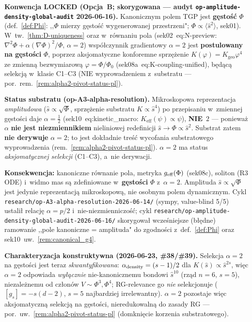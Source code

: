 \begin{remark}%
\label{rem:amplitude-vs-density-alpha}
\textbf{Konwencja LOCKED (Opcja~B; skorygowana --- audyt \texttt{op-amplitude-density-global-audit} 2026-06-16).}
Kanonicznym polem TGP jest \textbf{g\k{e}sto\'s\'c} $\Phi$ (def.~\ref{def:Phi}: ,,$\Phi$ mierzy g\k{e}sto\'s\'c
wygenerowanej przestrzeni"; $\Phi\propto\langle\hat s^2\rangle$, sek01). W~tw.~\ref{thm:D-uniqueness}
oraz w~r\'ownaniu pola (sek02~eq:N-preview: $\nabla^2\Phi+\alpha(\nabla\Phi)^2/\Phi$, $\alpha=2$)
wsp\'o\l{}czynnik gradientowy $\alpha=2$ jest \textbf{postulowany na g\k{e}sto\'sci} $\Phi$, poprzez aksjomatyczne
konforemne sprz\k{e}\.zenie $K(\varphi)=K_{\mathrm{geo}}\varphi^4$ ze zmienn\k{a} bezwymiarow\k{a}
$\varphi=\Phi/\Phi_0$ (sek08a~eq:K-coupling-unified), b\k{e}d\k{a}c\k{a} selekcj\k{a} w~klasie C1--C3
(NIE wyprowadzeniem z~substratu --- por.\ rem.~\ref{rem:alpha2-pivot-status-pl}).

\medskip\noindent\textbf{Status substratu (op-A3-alpha-resolution).} Mikroskopowa reprezentacja
\emph{amplitudowa} ($\hat s\propto\sqrt{\Phi}$, sprz\k{e}\.zenie substratu $K\propto\hat s^4$) po przepisaniu
w~zmiennej g\k{e}sto\'sci daje $\alpha=\tfrac12$ (sek10~eq:kinetic\_macro: $K_{\mathrm{eff}}(\psi)\propto\psi$),
\textbf{NIE}~$2$ --- poniewa\.z $\alpha$ \textbf{nie jest niezmiennikiem} nieliniowej redefinicji
$\hat s\to\Phi\propto\hat s^2$. Substrat zatem \textbf{nie derywuje} $\alpha=2$; to jest dok\l{}adnie tre\'s\'c
wycofania substratowego wyprowadzenia (rem.~\ref{rem:alpha2-pivot-status-pl}). $\alpha=2$ ma status
\emph{aksjomatycznej selekcji} (C1--C3), a~nie derywacji.

\medskip\noindent\textbf{Konsekwencja:} kanoniczne r\'ownanie pola, metryka $g_{\rm eff}(\Phi)$ (sek08c),
soliton (R3 ODE) i~widmo mas s\k{a} zdefiniowane w~\textbf{g\k{e}sto\'sci} $\Phi$ z~$\alpha=2$.
Amplituda $\hat s\propto\sqrt{\Phi}$ jest jedynie reprezentacj\k{a} mikroskopow\k{a}, nie osobnym polem
dynamicznym. Cykl \texttt{research/op-A3-alpha-resolution-2026-06-14/} (sympy, value-blind 5/5) ustali\l{}
relacj\k{e} $\alpha=p/2$ i~nie-niezmienniczo\'s\'c; cykl \texttt{research/op-amplitude-density-global-audit-2026-06-16/}
skorygowa\l{} wcze\'sniejsze (b\l{}\k{e}dne) ramowanie ,,pole kanoniczne = amplituda" do zgodno\'sci
z~def.~\ref{def:Phi} oraz sek10~uw.~\ref{rem:canonical_g4}.

\medskip\noindent\textbf{Charakteryzacja konstruktywna (2026-06-23, \#38/\#39).} Selekcja
$\alpha=2$ na g\k{e}sto\'sci jest teraz \emph{skwantyfikowana}: $\alpha_{\rm density}=(s-1)/2$
dla $K(\hat s)\propto\hat s^{2s}$, wi\k{e}c $\alpha=2$ odpowiada \emph{wy\l{}\k{a}cznie}
nie-kanonicznemu bondowi $\hat s^{10}$ (rz\k{a}d $n=6$, $s=5$), niezale\.znemu od cz\l{}on\'ow
$V\sim\Phi^3,\Phi^4$; RG-relevance go \emph{nie} selekcjonuje ($[g_s]=-s(d-2)$, $s=5$
najbardziej irrelewantny). $\alpha=2$ pozostaje wi\k{e}c aksjomatyczn\k{a} selekcj\k{a} na
g\k{e}sto\'sci, nieredukowaln\k{a} do zasady RG --- por.\ uw.~\ref{rem:alpha2-pivot-status-pl}
(domkni\k{e}cie korzenia substratowego).
\end{remark}

